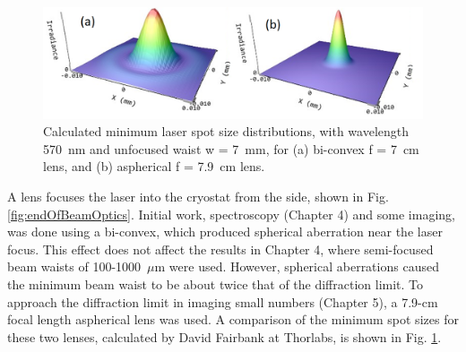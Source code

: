 \begin{figure} %
        \centering
                \includegraphics[width=.7\textwidth]{figures/DFairbank_aber.png}
                \caption{Calculated minimum laser spot size distributions, with wavelength 570~nm and unfocused waist w = 7~mm, for (a) bi-convex f = 7~cm lens, and (b) aspherical f = 7.9~cm lens.}
\label{fig:DFairbank}
\end{figure}

A lens focuses the laser into the cryostat from the side, shown in Fig. \ref{fig:endOfBeamOptics}.  Initial work, spectroscopy (Chapter 4) and some imaging, was done using a bi-convex, which produced spherical aberration near the laser focus.  This effect does not affect the results in Chapter 4, where semi-focused beam waists of 100-1000~$\mu$m were used.  However, spherical aberrations caused the minimum beam waist to be about twice that of the diffraction limit.  To approach the diffraction limit in imaging small numbers (Chapter 5), a 7.9-cm focal length aspherical lens was used.  A comparison of the minimum spot sizes for these two lenses, calculated by David Fairbank at Thorlabs, is shown in Fig. \ref{fig:DFairbank}.

